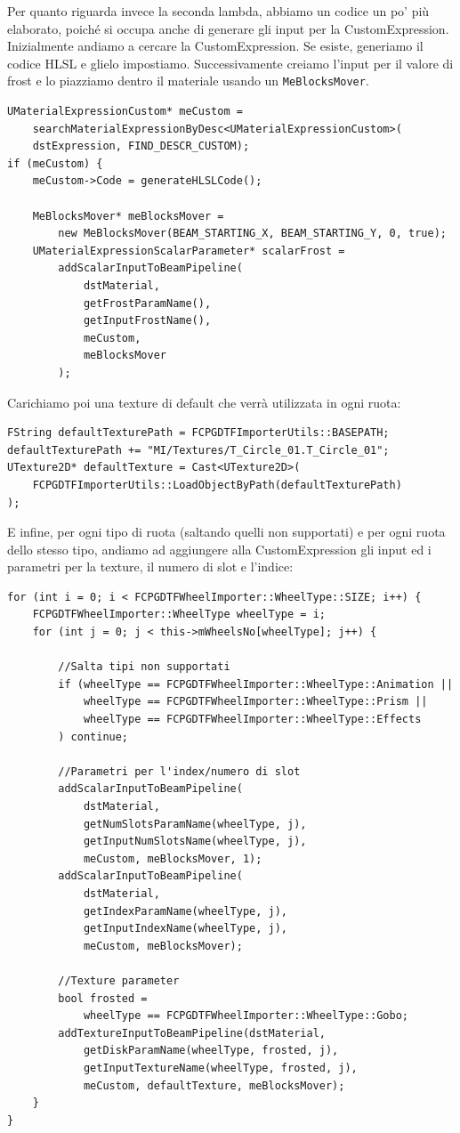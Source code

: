 \documentclass[main.tex]{subfiles}
\begin{document}
Per quanto riguarda invece la seconda lambda, abbiamo un codice un po' più elaborato, poiché si occupa anche di generare gli input per la CustomExpression.
Inizialmente andiamo a cercare la CustomExpression. Se esiste, generiamo il codice HLSL e glielo impostiamo. Successivamente creiamo l'input per il valore di frost e lo piazziamo dentro il materiale usando un \lstinline{MeBlocksMover}.
\begin{lstlisting}
UMaterialExpressionCustom* meCustom =
    searchMaterialExpressionByDesc<UMaterialExpressionCustom>(
    dstExpression, FIND_DESCR_CUSTOM);
if (meCustom) {
    meCustom->Code = generateHLSLCode();
    
    MeBlocksMover* meBlocksMover =
        new MeBlocksMover(BEAM_STARTING_X, BEAM_STARTING_Y, 0, true);
    UMaterialExpressionScalarParameter* scalarFrost =
        addScalarInputToBeamPipeline(
            dstMaterial,
            getFrostParamName(),
            getInputFrostName(),
            meCustom,
            meBlocksMover
        );
\end{lstlisting}
Carichiamo poi una texture di default che verrà utilizzata in ogni ruota:
\begin{lstlisting}
FString defaultTexturePath = FCPGDTFImporterUtils::BASEPATH;
defaultTexturePath += "MI/Textures/T_Circle_01.T_Circle_01";
UTexture2D* defaultTexture = Cast<UTexture2D>(
    FCPGDTFImporterUtils::LoadObjectByPath(defaultTexturePath)
);
\end{lstlisting}
E infine, per ogni tipo di ruota (saltando quelli non supportati) e per ogni ruota dello stesso tipo, andiamo ad aggiungere alla CustomExpression gli input ed i parametri per la texture, il numero di slot e l'indice:
\begin{lstlisting}
for (int i = 0; i < FCPGDTFWheelImporter::WheelType::SIZE; i++) {
    FCPGDTFWheelImporter::WheelType wheelType = i;
    for (int j = 0; j < this->mWheelsNo[wheelType]; j++) {

        //Salta tipi non supportati
        if (wheelType == FCPGDTFWheelImporter::WheelType::Animation ||
            wheelType == FCPGDTFWheelImporter::WheelType::Prism ||
            wheelType == FCPGDTFWheelImporter::WheelType::Effects
        ) continue;

        //Parametri per l'index/numero di slot
        addScalarInputToBeamPipeline(
            dstMaterial,
            getNumSlotsParamName(wheelType, j),
            getInputNumSlotsName(wheelType, j),
            meCustom, meBlocksMover, 1);
        addScalarInputToBeamPipeline(
            dstMaterial,
            getIndexParamName(wheelType, j),
            getInputIndexName(wheelType, j),
            meCustom, meBlocksMover);

        //Texture parameter
        bool frosted =
            wheelType == FCPGDTFWheelImporter::WheelType::Gobo;
        addTextureInputToBeamPipeline(dstMaterial,
            getDiskParamName(wheelType, frosted, j),
            getInputTextureName(wheelType, frosted, j),
            meCustom, defaultTexture, meBlocksMover);
    }
}
\end{lstlisting}
\end{document}

